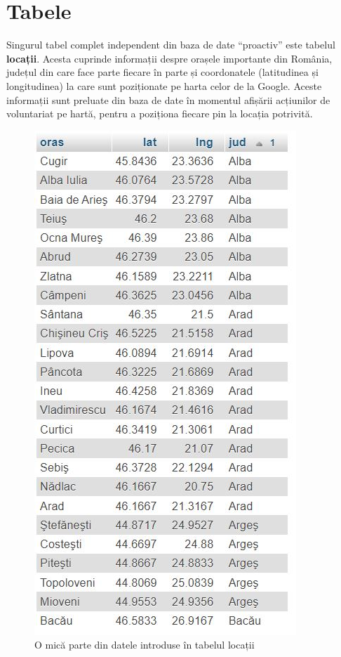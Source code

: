 \documentclass[12pt,a4paper]{report}
\begin{document}
\section{Tabele}
\par
Singurul tabel complet independent din baza de date “proactiv” este tabelul \textbf{locații}. Acesta cuprinde informații despre orașele importante din România, județul din care face parte fiecare în parte și coordonatele (latitudinea și longitudinea) la care sunt poziționate pe harta celor de la Google. Aceste informații sunt preluate din baza de date în momentul afișării acțiunilor de voluntariat pe hartă, pentru a poziționa fiecare pin la locația potrivită.
\\
\begin{figure}[H]
\centering
  \includegraphics[width=0.6\linewidth]{./imagini/locatii.jpg}
  \caption{O mică parte din datele introduse în tabelul locații}
\end{figure}
\end{document}
